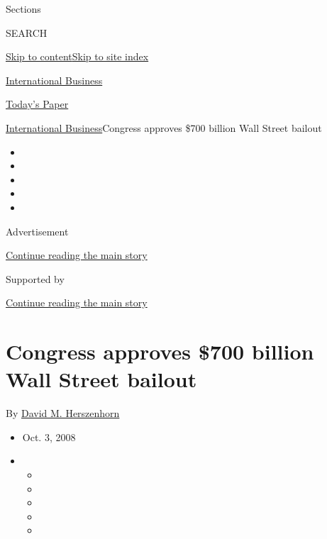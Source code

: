 Sections

SEARCH

\protect\hyperlink{site-content}{Skip to
content}\protect\hyperlink{site-index}{Skip to site index}

\href{https://www.nytimes3xbfgragh.onion/section/business}{International
Business}

\href{https://myaccount.nytimes3xbfgragh.onion/auth/login?response_type=cookie\&client_id=vi}{}

\href{https://www.nytimes3xbfgragh.onion/section/todayspaper}{Today's
Paper}

\href{/section/business}{International Business}\textbar{}Congress
approves \$700 billion Wall Street bailout

\begin{itemize}
\item
\item
\item
\item
\item
\end{itemize}

Advertisement

\protect\hyperlink{after-top}{Continue reading the main story}

Supported by

\protect\hyperlink{after-sponsor}{Continue reading the main story}

\hypertarget{congress-approves-700-billion-wall-street-bailout}{%
\section{Congress approves \$700 billion Wall Street
bailout}\label{congress-approves-700-billion-wall-street-bailout}}

By
\href{https://www.nytimes3xbfgragh.onion/by/david-m-herszenhorn}{David
M. Herszenhorn}

\begin{itemize}
\item
  Oct. 3, 2008
\item
  \begin{itemize}
  \item
  \item
  \item
  \item
  \item
  \end{itemize}
\end{itemize}

